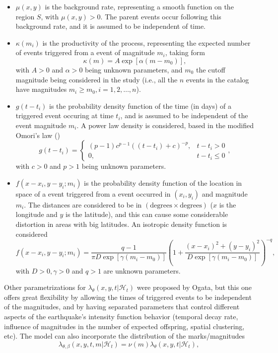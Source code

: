 \begin{itemize}
\item $\mu(x,y)$ is the background rate, representing a smooth function on the region $S$, with $\mu(x,y) > 0$. The parent events occur following this background rate, and it is assumed to be independent of time.
\item $\kappa(m_{i})$ is the productivity of the process, representing the expected number of events triggered from a event of magnitude $m_{i}$, taking form
  \begin{equation*}
    \kappa(m) = A\exp[\alpha(m - m_{0})],
  \end{equation*}
  with $A > 0$ and $\alpha > 0$ being unknown parameters, and $m_{0}$ the cutoff magnitude being considered in the study (i.e., all the $n$ events in the catalog have magnitudes $m_{i} \ge m_{0}, i = 1, 2,\ldots, n$).
\item $g(t - t_{i})$ is the probability density function of the time (in days) of a triggered event occuring at time $t_{i}$, and is assumed to be independent of the event magnitude $m_{i}$. A power law density is considered, based in the modified Omori's law ()
  \begin{equation*}
    g(t - t_{i}) =
    \begin{cases}
      (p - 1)c^{p-1}\left((t - t_{i}) + c\right)^{-p}, & t - t_{i} > 0 \\
      0, & t - t_{i} \le 0
    \end{cases},
  \end{equation*}
  with $c > 0$ and $p > 1$ being unknown parameters.
\item $f(x - x_{i}, y - y_{i};m_{i})$ is the probability density function of the location in space of a event triggered from a event occurred in $(x_{i}, y_{i})$ and magnitude $m_{i}$. The distances are considered to be in $(\text{degrees}\times\text{degrees})$ ($x$ is the longitude and $y$ is the latitude), and this can cause some considerable distortion in areas with big latitudes. An isotropic density function is considered
  \begin{equation*}
    f(x - x_{i}, y - y_{i};m_{i}) = \frac{q - 1}{\pi D \exp[\gamma(m_{i} - m_{0})]}\left(1 + \frac{(x - x_{i})^{2} + (y - y_{i})^{2}}{D \exp[\gamma(m_{i} - m_{0})]}\right)^{-q},
  \end{equation*}
  with $D > 0, \gamma > 0$ and $q > 1$ are unknown parameters.
\end{itemize}

Other parametrizations for $\lambda_{\theta}(x,y,t|\mathcal{H}_{t})$ were proposed by Ogata, but this one offers great flexibility by allowing the times of triggered events to be independent of the magnitudes, and by having separated parameters that control different aspects of the earthquake's intensity function behavior (temporal decay rate, influence of magnitudes in the number of expected offspring, spatial clustering, etc). The model can also incorporate the distribution of the marks/magnitudes
\begin{equation}
  \label{eq-model-etas-marks}
  \lambda_{\theta,\beta}(x,y,t,m|\mathcal{H}_{t}) = \nu(m)\lambda_{\theta}(x,y,t|\mathcal{H}_{t}),
\end{equation}

